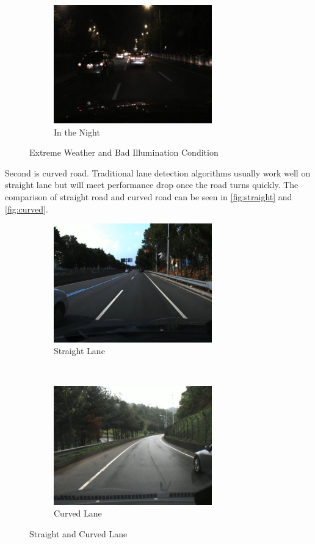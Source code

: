 \begin{spacing}{1.5}
\begin{figure}[th]
    ~
    \begin{subfigure}[b]{0.49\textwidth}
        \centering
        \includegraphics[width=2.7in, fbox]{Chapter1/night.png}
        \caption{In the Night}
        \label{fig:night} 
    \end{subfigure}
    \caption{Extreme Weather and Bad Illumination Condition}
\end{figure}

Second is curved road. Traditional lane detection algorithms usually work well on straight lane but will meet performance drop once the road turns quickly. The comparison of straight road and curved road can be seen in \autoref{fig:straight} and \autoref{fig:curved}.

\begin{figure}[th]
    \centering
    \begin{subfigure}[b]{0.49\textwidth}
        \centering
        \includegraphics[width=2.7in, fbox]{Chapter1/straight.png}
        \caption{Straight Lane}
        \label{fig:straight} 
    \end{subfigure}%
    ~
    \begin{subfigure}[b]{0.49\textwidth}
        \centering
        \includegraphics[width=2.7in, fbox]{Chapter1/curved.png}
        \caption{Curved Lane}
        \label{fig:curved} 
    \end{subfigure}
    \caption{Straight and Curved Lane}
\end{figure}


\end{spacing}
